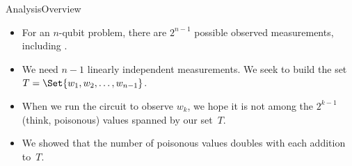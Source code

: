 \begin{frame}{Analysis}{Overview}

\begin{itemize}
    \item<1-> For an $n$-qubit problem, there are $2^{n-1}$ possible observed measurements, including .
    \item<2-> We need $n-1$ linearly independent measurements.  We seek to build the set $T=\Set{w_{1},w_{2},\ldots, w_{n-1}}$.
    \item<3-> When we run the circuit to observe $w_{k}$, we hope it is not among the $2^{k-1}$ (think, poisonous) values spanned by our set~$T$.
    \item<4-> We showed that the number of poisonous values doubles with each addition to~$T$.
\end{itemize}
    
\end{frame}
